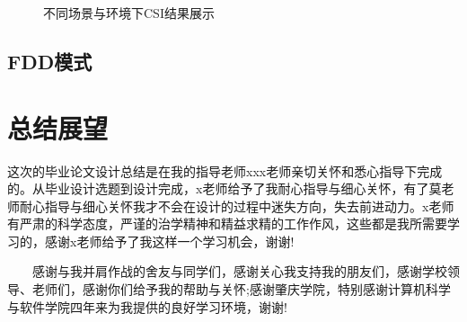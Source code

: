 \documentclass[master]{seuthesis} %
\begin{document}
\begin{Main}
\begin{figure}
{    }
    \quad
    \caption{不同场景与环境下CSI结果展示}{} %
    \label{csi_ab}
  \end{figure}

  
\section{FDD模式}

\chapter{总结展望}

\end{Main} %

\begin{Acknowledgement}{}
这次的毕业论文设计总结是在我的指导老师xxx老师亲切关怀和悉心指导下完成的。从毕业设计选题到设计完成，x老师给予了我耐心指导与细心关怀，有了莫老师耐心指导与细心关怀我才不会在设计的过程中迷失方向，失去前进动力。x老师有严肃的科学态度，严谨的治学精神和精益求精的工作作风，这些都是我所需要学习的，感谢x老师给予了我这样一个学习机会，谢谢!

　　感谢与我并肩作战的舍友与同学们，感谢关心我支持我的朋友们，感谢学校领导、老师们，感谢你们给予我的帮助与关怀;感谢肇庆学院，特别感谢计算机科学与软件学院四年来为我提供的良好学习环境，谢谢!
\end{Acknowledgement}
\end{document}
